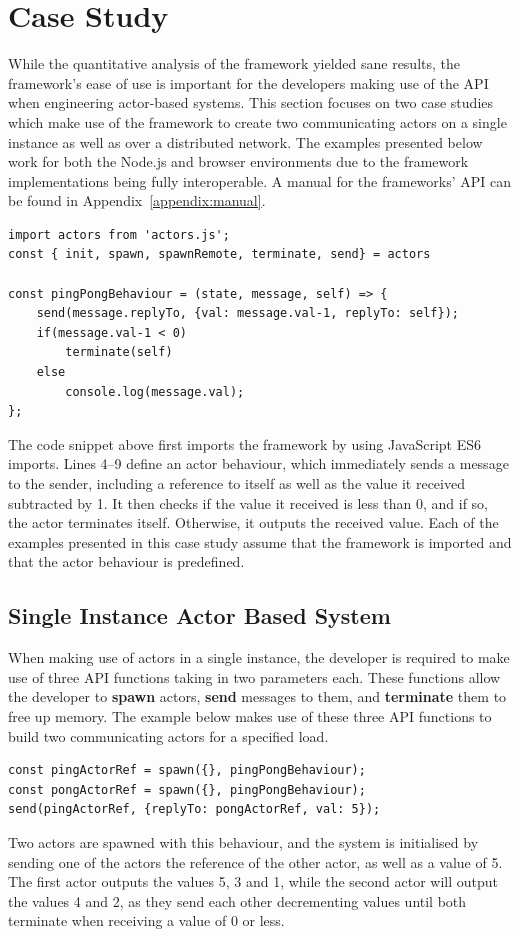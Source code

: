 \documentclass[oneside]{um-fict}
\begin{document}
\section{Case Study}
While the quantitative analysis of the framework yielded sane results, the framework's ease of use is important for the developers making use of the API when engineering actor-based systems. This section focuses on two case studies which make use of the framework to create two communicating actors on a single instance as well as over a distributed network. The examples presented below work for both the Node.js and browser environments due to the framework implementations being fully interoperable. A manual for the frameworks' API can be found in Appendix~\ref{appendix:manual}.
\begin{lstlisting}    
import actors from 'actors.js';
const { init, spawn, spawnRemote, terminate, send} = actors

const pingPongBehaviour = (state, message, self) => {
    send(message.replyTo, {val: message.val-1, replyTo: self});
    if(message.val-1 < 0)
        terminate(self)
    else    
        console.log(message.val);
};
\end{lstlisting}
The code snippet above first imports the framework by using JavaScript ES6 imports. Lines 4--9 define an actor behaviour, which immediately sends a message to the sender, including a reference to itself as well as the value it received subtracted by 1. It then checks if the value it received is less than 0, and if so, the actor terminates itself. Otherwise, it outputs the received value. Each of the examples presented in this case study assume that the framework is imported and that the actor behaviour is predefined. 
\subsection{Single Instance Actor Based System}
When making use of actors in a single instance, the developer is required to make use of three API functions taking in two parameters each. These functions allow the developer to \textbf{spawn} actors, \textbf{send} messages to them, and \textbf{terminate} them to free up memory. The example below makes use of these three API functions to build two communicating actors for a specified load.
\begin{lstlisting}    
const pingActorRef = spawn({}, pingPongBehaviour);
const pongActorRef = spawn({}, pingPongBehaviour);
send(pingActorRef, {replyTo: pongActorRef, val: 5});
\end{lstlisting}
Two actors are spawned with this behaviour, and the system is initialised by sending one of the actors the reference of the other actor, as well as a value of 5. The first actor outputs the values 5, 3 and 1, while the second actor will output the values 4 and 2, as they send each other decrementing values until both terminate when receiving a value of 0 or less.
\end{document}
